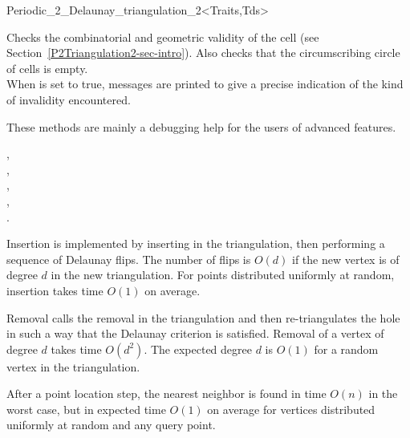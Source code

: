 \begin{ccRefClass}{Periodic_2_Delaunay_triangulation_2<Traits,Tds>}
\begin{ccAdvanced}
{Checks the combinatorial and geometric validity of the cell (see
Section~\ref{P2Triangulation2-sec-intro}). Also checks that the
circumscribing circle of cells is empty.\\
When  is set to true, messages are printed to give
a precise indication of the kind of invalidity encountered.}

These methods are  mainly a debugging help for the users of advanced features.
\end{ccAdvanced}

\ccSeeAlso

, \\
, \\
, \\
, \\
.


Insertion is implemented by inserting in the triangulation, then
performing a sequence of Delaunay flips. The number of flips is $O(d)$
if the new vertex is of degree $d$ in the new triangulation. For
points distributed uniformly at random, insertion takes time $O(1)$ on
average.

Removal calls the removal in the triangulation and then
re-triangulates the hole in such a way that the Delaunay criterion is
satisfied. Removal of a vertex of degree $d$ takes time $O(d^2)$. The
expected degree $d$ is $O(1)$ for a random vertex in the
triangulation.

After a point location step, the nearest neighbor is found in time
$O(n)$ in the worst case, but in expected time $O(1)$ on average for
vertices distributed uniformly at random and any query point.
\end{ccRefClass}
